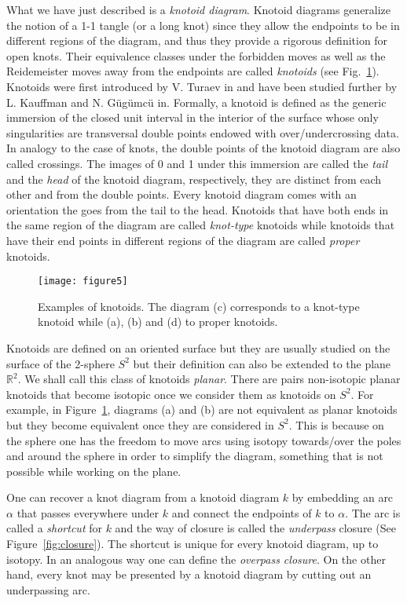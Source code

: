 What we have just described is a {\it knotoid diagram}. Knotoid diagrams generalize the notion of a 1-1 tangle (or a long knot) since they allow the endpoints to be in different regions of the diagram, and thus they provide a rigorous definition for open knots. Their equivalence classes under the forbidden moves as well as the Reidemeister moves away from the endpoints  are called {\it knotoids} (see Fig.~\ref{fig:knotoid}). Knotoids were first introduced by V. Turaev in\cite{turaev} and have been studied further by L. Kauffman and N. G\"ug\"umc\"u in\cite{guka}.  Formally, a knotoid is defined as the generic  immersion  of  the  closed unit interval  in  the  interior  of the surface whose  only  singularities are  transversal  double  points  endowed  with  over/undercrossing  data. In analogy to the case of knots, the double points of the knotoid diagram are also called crossings.   The  images  of  0 and  1  under  this  immersion  are  called  the {\it tail} and  the {\it head} of the knotoid diagram,  respectively, they are  distinct  from  each other  and from  the  double  points.  Every knotoid diagram comes with an orientation the goes from the tail to the head\cite{turaev}.  Knotoids that have both ends in the same region of the diagram are called {\it knot-type} knotoids while knotoids that have their end points in different regions of the diagram are called {\it proper} knotoids.

\begin{figure}[h]
\centering
\texttt{[image: figure5]}
\caption{Examples of knotoids. The diagram (c) corresponds to a knot-type knotoid while (a), (b) and (d) to proper knotoids.}\label{fig:knotoid}
\end{figure}

Knotoids are defined on an oriented surface but they are usually studied on the surface of the 2-sphere $S^2$ but their definition can also be extended to the plane $\mathbb{R}^2$. We shall call this class of knotoids {\it planar}. There are pairs non-isotopic planar knotoids that become isotopic once we consider them as knotoids on $S^2$. For example, in Figure~\ref{fig:knotoid}, diagrams (a) and (b) are not equivalent as planar knotoids but they become equivalent once they are considered in $S^2$. This is because on the sphere one has the freedom to move arcs using isotopy towards/over the poles and around the sphere in order to simplify the diagram, something that is not possible while working on the plane.


One can recover a knot diagram from a knotoid diagram $k$ by embedding an arc $\alpha$ that passes everywhere under $k$ and connect the endpoints of $k$ to $\alpha$. The arc is called a {\it shortcut} for $k$ and the way of closure is called the {\it underpass} closure  (See Figure~\ref{fig:closure}). The shortcut is unique for every knotoid diagram, up to isotopy. In an analogous way one can define the {\it overpass closure}\cite{turaev, guka}. On the other hand, every knot may be presented by a knotoid diagram by cutting out an underpassing arc\cite{turaev}.


